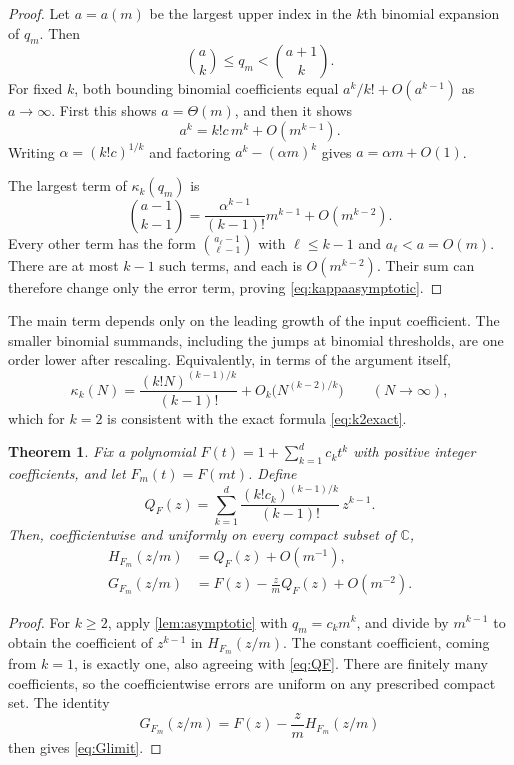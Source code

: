 \documentclass[11pt,letterpaper]{article}
\numberwithin{equation}{section}
\newtheorem{theorem}{Theorem}[section]
\newtheorem{lemma}[theorem]{Lemma}
\theoremstyle{definition}
\theoremstyle{remark}
\newcommand{\kap}{\kappa}
\begin{document}
\begin{proof}
Let $a=a(m)$ be the largest upper index in the $k$th binomial expansion of
$q_m$. Then
\[
 \binom ak\le q_m<\binom{a+1}{k}.
\]
For fixed $k$, both bounding binomial coefficients equal
$a^k/k!+O(a^{k-1})$ as $a\to\infty$. First this shows $a=\Theta(m)$, and
then it shows
\[
 a^k=k!c\,m^k+O(m^{k-1}).
\]
Writing $\alpha=(k!c)^{1/k}$ and factoring
$a^k-(\alpha m)^k$ gives $a=\alpha m+O(1)$.

The largest term of $\kap_k(q_m)$ is
\[
 \binom{a-1}{k-1}
 =\frac{\alpha^{k-1}}{(k-1)!}m^{k-1}+O(m^{k-2}).
\]
Every other term has the form $\binom{a_\ell-1}{\ell-1}$ with
$\ell\le k-1$ and $a_\ell<a=O(m)$. There are at most $k-1$ such terms,
and each is $O(m^{k-2})$. Their sum can therefore change only the error
term, proving \eqref{eq:kappaasymptotic}.
\end{proof}

The main term depends only on the leading growth of the input coefficient.
The smaller binomial summands, including the jumps at binomial thresholds,
are one order lower after rescaling. Equivalently, in terms of the argument
itself,
\[
 \kap_k(N)=\frac{(k!N)^{(k-1)/k}}{(k-1)!}+O_k\bigl(N^{(k-2)/k}\bigr)
 \qquad(N\to\infty),
\]
which for $k=2$ is consistent with the exact formula \eqref{eq:k2exact}.

\begin{theorem}\label{thm:scaling}
Fix a polynomial $F(t)=1+\sum_{k=1}^dc_kt^k$ with positive integer
coefficients, and let $F_m(t)=F(mt)$. Define
\begin{equation}\label{eq:QF}
 Q_F(z)=\sum_{k=1}^d
 \frac{(k!c_k)^{(k-1)/k}}{(k-1)!}\,z^{k-1}.
\end{equation}
Then, coefficientwise and uniformly on every compact subset of $\mathbb C$,
\begin{align}
 H_{F_m}(z/m)&=Q_F(z)+O(m^{-1}),\label{eq:Hlimit}\\
 G_{F_m}(z/m)&=F(z)-\frac{z}{m}Q_F(z)+O(m^{-2}).\label{eq:Glimit}
\end{align}
\end{theorem}
\begin{proof}
For $k\ge2$, apply \cref{lem:asymptotic} with $q_m=c_km^k$, and divide by
$m^{k-1}$ to obtain the coefficient of $z^{k-1}$ in
$H_{F_m}(z/m)$. The constant coefficient, coming from $k=1$, is exactly
one, also agreeing with \eqref{eq:QF}. There are finitely many
coefficients, so the coefficientwise errors are uniform on any prescribed
compact set. The identity
\[
 G_{F_m}(z/m)=F(z)-\frac zmH_{F_m}(z/m)
\]
then gives \eqref{eq:Glimit}.
\end{proof}
\end{document}
